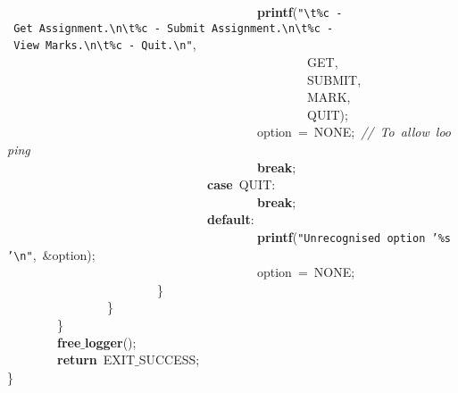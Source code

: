 \mbox{}\ \ \ \ \ \ \ \ \ \ \ \ \ \ \ \ \ \ \ \ \ \ \ \ \ \ \ \ \ \ \ \ \ \ \ \ \ \ \ \ \textbf{printf}(\texttt{"{}}\texttt{\textbackslash{}t}\texttt{\%c\ -\ Get\ Assignment.}\texttt{\textbackslash{}n\textbackslash{}t}\texttt{\%c\ -\ Submit\ Assignment.}\texttt{\textbackslash{}n\textbackslash{}t}\texttt{\%c\ -\ View\ Marks.}\texttt{\textbackslash{}n\textbackslash{}t}\texttt{\%c\ -\ Quit.}\texttt{\textbackslash{}n}\texttt{"{}},\  \\
\mbox{}\ \ \ \ \ \ \ \ \ \ \ \ \ \ \ \ \ \ \ \ \ \ \ \ \ \ \ \ \ \ \ \ \ \ \ \ \ \ \ \ \ \ \ \ \ \ \ \ GET,\  \\
\mbox{}\ \ \ \ \ \ \ \ \ \ \ \ \ \ \ \ \ \ \ \ \ \ \ \ \ \ \ \ \ \ \ \ \ \ \ \ \ \ \ \ \ \ \ \ \ \ \ \ SUBMIT,\  \\
\mbox{}\ \ \ \ \ \ \ \ \ \ \ \ \ \ \ \ \ \ \ \ \ \ \ \ \ \ \ \ \ \ \ \ \ \ \ \ \ \ \ \ \ \ \ \ \ \ \ \ MARK,\  \\
\mbox{}\ \ \ \ \ \ \ \ \ \ \ \ \ \ \ \ \ \ \ \ \ \ \ \ \ \ \ \ \ \ \ \ \ \ \ \ \ \ \ \ \ \ \ \ \ \ \ \ QUIT); \\
\mbox{}\ \ \ \ \ \ \ \ \ \ \ \ \ \ \ \ \ \ \ \ \ \ \ \ \ \ \ \ \ \ \ \ \ \ \ \ \ \ \ \ option\ =\ NONE;\ \textit{//\ To\ allow\ looping} \\
\mbox{}\ \ \ \ \ \ \ \ \ \ \ \ \ \ \ \ \ \ \ \ \ \ \ \ \ \ \ \ \ \ \ \ \ \ \ \ \ \ \ \ \textbf{break}; \\
\mbox{}\ \ \ \ \ \ \ \ \ \ \ \ \ \ \ \ \ \ \ \ \ \ \ \ \ \ \ \ \ \ \ \ \textbf{case}\ QUIT: \\
\mbox{}\ \ \ \ \ \ \ \ \ \ \ \ \ \ \ \ \ \ \ \ \ \ \ \ \ \ \ \ \ \ \ \ \ \ \ \ \ \ \ \ \textbf{break}; \\
\mbox{}\ \ \ \ \ \ \ \ \ \ \ \ \ \ \ \ \ \ \ \ \ \ \ \ \ \ \ \ \ \ \ \ \textbf{default}: \\
\mbox{}\ \ \ \ \ \ \ \ \ \ \ \ \ \ \ \ \ \ \ \ \ \ \ \ \ \ \ \ \ \ \ \ \ \ \ \ \ \ \ \ \textbf{printf}(\texttt{"{}Unrecognised\ option\ '\%s'}\texttt{\textbackslash{}n}\texttt{"{}},\ \&option); \\
\mbox{}\ \ \ \ \ \ \ \ \ \ \ \ \ \ \ \ \ \ \ \ \ \ \ \ \ \ \ \ \ \ \ \ \ \ \ \ \ \ \ \ option\ =\ NONE; \\
\mbox{}\ \ \ \ \ \ \ \ \ \ \ \ \ \ \ \ \ \ \ \ \ \ \ \ \} \\
\mbox{}\ \ \ \ \ \ \ \ \ \ \ \ \ \ \ \ \} \\
\mbox{}\ \ \ \ \ \ \ \ \} \\
\mbox{}\ \ \ \ \ \ \ \ \textbf{free$\_$logger}(); \\
\mbox{}\ \ \ \ \ \ \ \ \textbf{return}\ EXIT$\_$SUCCESS; \\
\mbox{}\} \\

